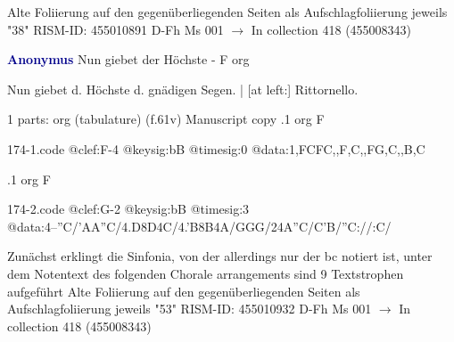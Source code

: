 \documentclass[twocolumn]{book}
\begin{document}
\newline Alte Foliierung auf den gegenüberliegenden Seiten als Aufschlagfoliierung jeweils "38"
\newline RISM-ID: 455010891
\newline D-Fh  Ms 001
\newline $\rightarrow$ In collection 418 (455008343)
      
\newline \par \vspace{7pt} \textcolor{darkblue}{\textbf{Anonymus  }}
\newline Nun giebet der Höchste - F
\newline org
\newline \begin{itshape}[heading, f.61v:] Nun giebet d. Höchste d. gnädigen Segen. | [at left:] Rittornello.\end{itshape} 
\newline \textcolor{darkblue}{}  1 parts: org (tabulature)  (f.61v)
\newline Manuscript copy
.1  org  F  
\begin{filecontents*}{174-1.code}
@clef:F-4
@keysig:bB
@timesig:0
@data:1,FCFC,,F,C,,FG,C,,B,C
\end{filecontents*}
\newline
%

.1  org  F  
\begin{filecontents*}{174-2.code}
@clef:G-2
@keysig:bB
@timesig:3
@data:4--''C/'AA''C/4.D8D4C/4.'B8B4A/GGG/24A''C/C'B/''C://:C/
\end{filecontents*}
\newline
%

\newline Zunächst erklingt die Sinfonia, von der allerdings nur der bc notiert ist, unter dem Notentext des folgenden Chorale arrangements sind 9 Textstrophen aufgeführt
\newline Alte Foliierung auf den gegenüberliegenden Seiten als Aufschlagfoliierung jeweils "53"
\newline RISM-ID: 455010932
\newline D-Fh  Ms 001
\newline $\rightarrow$ In collection 418 (455008343)
      
\end{document}
